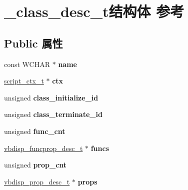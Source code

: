 \hypertarget{struct__class__desc__t}{}\section{\+\_\+class\+\_\+desc\+\_\+t结构体 参考}
\label{struct__class__desc__t}
\subsection*{Public 属性}
\begin{DoxyCompactItemize}
\item 
\mbox{\label{struct__class__desc__t_ae062204d4242a92802b15f83609a3764}} 
const W\+C\+H\+AR $\ast$ {\bfseries name}
\item 
\mbox{\label{struct__class__desc__t_a773983e6b29c4d2a7142e758b8b13269}} 
\hyperlink{struct__script__ctx__t}{script\+\_\+ctx\+\_\+t} $\ast$ {\bfseries ctx}
\item 
\mbox{\label{struct__class__desc__t_a7ee298e913626a34c1359bbd65467a92}} 
unsigned {\bfseries class\+\_\+initialize\+\_\+id}
\item 
\mbox{\label{struct__class__desc__t_a6259cf9658544732767c75970f8a271a}} 
unsigned {\bfseries class\+\_\+terminate\+\_\+id}
\item 
\mbox{\label{struct__class__desc__t_a8e8029f9a67c26a515b538d84a1d6b60}} 
unsigned {\bfseries func\+\_\+cnt}
\item 
\mbox{\label{struct__class__desc__t_a5a150ab7e80d850b73cfbf4efdc96c8b}} 
\hyperlink{structvbdisp__funcprop__desc__t}{vbdisp\+\_\+funcprop\+\_\+desc\+\_\+t} $\ast$ {\bfseries funcs}
\item 
\mbox{\label{struct__class__desc__t_a10dbbf6bfe77ebfcacf8441dd9b71b61}} 
unsigned {\bfseries prop\+\_\+cnt}
\item 
\mbox{\label{struct__class__desc__t_a1d16ea9ebdfeb0c9acb24b2359f8bc45}} 
\hyperlink{structvbdisp__prop__desc__t}{vbdisp\+\_\+prop\+\_\+desc\+\_\+t} $\ast$ {\bfseries props}

\end{DoxyCompactItemize}
